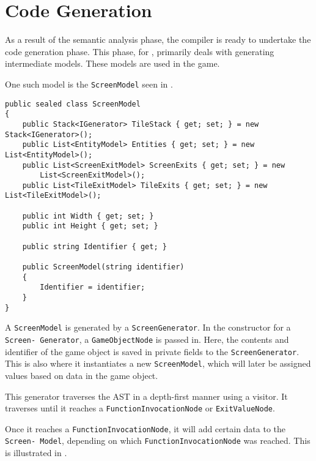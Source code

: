 \section{Code Generation} \label{sec:code_generation}
As a result of the semantic analysis phase, the \dazel{} compiler is ready to undertake the code generation phase.
This phase, for \dazel{}, primarily deals with generating intermediate models. These models are used in the \dazel{} game.

One such model is the \texttt{ScreenModel} seen in .

\begin{lstlisting}[language=CSharp, label={lst:screenmodel}, caption={The \texttt{ScreenModel} class.}]
public sealed class ScreenModel
{
    public Stack<IGenerator> TileStack { get; set; } = new Stack<IGenerator>();
    public List<EntityModel> Entities { get; set; } = new List<EntityModel>();
    public List<ScreenExitModel> ScreenExits { get; set; } = new 
        List<ScreenExitModel>();
    public List<TileExitModel> TileExits { get; set; } = new List<TileExitModel>();

    public int Width { get; set; }
    public int Height { get; set; }
    
    public string Identifier { get; }

    public ScreenModel(string identifier)
    {
        Identifier = identifier;
    }
}
\end{lstlisting}

A \texttt{ScreenModel} is generated by a \texttt{ScreenGenerator}. 
In the constructor for a \texttt{Screen-
Generator}, a \texttt{GameObjectNode} is passed in. Here, the contents and identifier of the game object is saved in private fields to the \texttt{ScreenGenerator}. This is also where it instantiates a new \texttt{ScreenModel}, which will later be assigned values based on data in the game object.  

This generator traverses the AST in a depth-first manner using a visitor. It traverses until it reaches a \texttt{FunctionInvocationNode} or \texttt{ExitValueNode}.

Once it reaches a \texttt{FunctionInvocationNode}, it will add certain data to the \texttt{Screen-
Model}, depending on which \texttt{FunctionInvocationNode} was reached. 
This is illustrated in .

